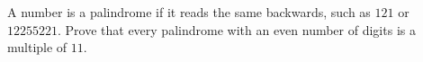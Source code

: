 A number is a palindrome if it reads the same backwards, such as $121$ or $12255221$. Prove that every palindrome with an even number of digits is a multiple of $11$.
